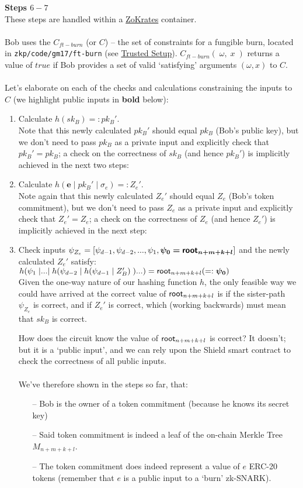 \textbf{Steps $6 - 7$}
\ \\
These steps are handled within a \hyperref[sec:zokrates]{ZoKrates} container.\\
\\
Bob uses the $C_{ft-burn}$ (or $C$) -- the set of constraints for a fungible burn, located in \texttt{zkp/code/gm17/ft-burn} (see \hyperref[sec:trustedSetup]{Trusted Setup}). $C_{ft-burn}(\;\omega,\;x\;)$ returns a value of $true$ if Bob provides a set of valid `satisfying' arguments $(\omega, x)$ to $C$.\\
\\
Let's elaborate on each of the checks and calculations constraining the inputs to $C$ (we highlight public inputs in \textbf{bold} below):
\begin{enumerate}
  \item Calculate $h(sk_B) =: pk_B'$.\\
    Note that this newly calculated $pk_B'$ should equal $pk_B$ (Bob's public key), but we don't need to pass $pk_B$ as a private input and explicitly check that $pk_B'=pk_B$; a check on the correctness of $sk_B$ (and hence $pk_B'$) is implicitly achieved in the next two steps:
  \item Calculate $h(\bm{e}\;|\;pk_B'\;|\;\sigma_e) =: Z_e'$.\\
    Note again that this newly calculated $Z_e'$ should equal $Z_e$ (Bob's token commitment), but we don't need to pass $Z_e$ as a private input and explicitly check that $Z_e'=Z_e$; a check on the correctness of $Z_e$ (and hence $Z_e'$) is implicitly achieved in the next step:
  \item Check inputs $\psi_{Z_e}=[\psi_{d-1}, \psi_{d-2},..., \psi_{1}, \bm{\psi_{0}=\mathsf{root}_{n+m+k+l}}]$ and the newly calculated $Z_e'$ satisfy:\\
    $h\br*{\psi_{1}\;|...|\;h\br*{\psi_{d-2}\;|\;h\br*{\psi_{d-1}\;|\;Z_B'}\;}...} = \roott_{n+m+k+l} ( =: \bm{\psi_{0}})$\\
    Given the one-way nature of our hashing function $h$, the only feasible way we could have arrived at the correct value of $\mathsf{root}_{n+m+k+l}$ is if the sister-path $\psi_{Z_e}$ is correct, and if $Z_e'$ is correct, which (working backwards) must mean that $sk_B$ is correct.

    How does the circuit know the value of $\mathsf{root}_{n+m+k+l}$ is correct? It doesn't; but it is a `public input', and we can rely upon the Shield smart contract to check the correctness of all public inputs.\\
  \\
  We've therefore shown in the steps so far, that:
  \begin{itemize}
    \item[--] Bob is the owner of a token commitment (because he knows its secret key)
    \item[--] Said token commitment is indeed a leaf of the on-chain Merkle Tree $M_{n+m+k+l}$.
    \item[--] The token commitment does indeed represent a value of $e$ ERC-20 tokens (remember that $e$ is a public input to a `burn' zk-SNARK).
  \end{itemize}


\end{enumerate}
